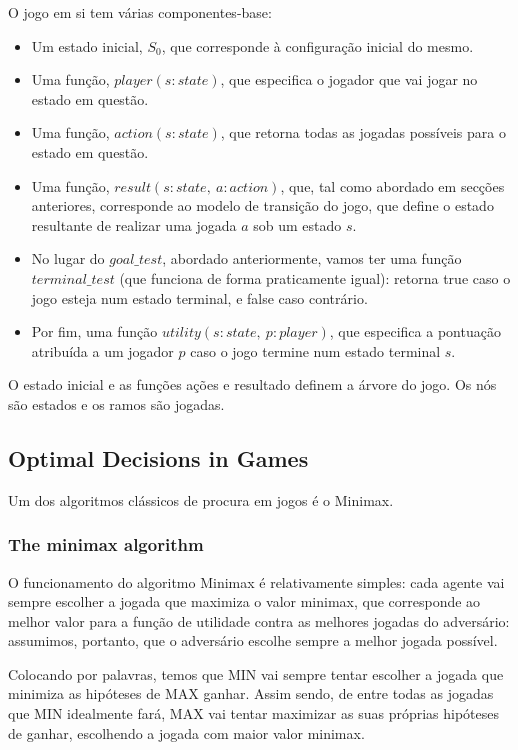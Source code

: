 \documentclass[11pt]{article}
\begin{document}
O jogo em si tem várias componentes-base:
\begin{itemize}[topsep=4pt, itemsep=0pt]
    \item Um estado inicial, $S_0$, que corresponde à configuração inicial do mesmo.
    \item Uma função, $player(s:state)$, que especifica o jogador que vai jogar no estado em questão.
    \item Uma função, $action(s:state)$, que retorna todas as jogadas possíveis para o estado em questão.
    \item Uma função, $result(s:state,\ a:action)$, que, tal como abordado em secções anteriores, corresponde ao modelo de transição do jogo, que define o estado resultante de realizar uma jogada $a$ sob um estado $s$.
    \item No lugar do $goal\_test$, abordado anteriormente, vamos ter uma função $terminal\_test$ (que funciona de forma praticamente igual): retorna true caso o jogo esteja num estado terminal, e false caso contrário.
    \item Por fim, uma função $utility(s:state,\ p:player)$, que especifica a pontuação atribuída a um jogador $p$ caso o jogo termine num estado terminal $s$.
\end{itemize}

O estado inicial e as funções ações e resultado definem a árvore do jogo. Os nós são estados e os ramos são jogadas.

\subsection{Optimal Decisions in Games}

Um dos algoritmos clássicos de procura em jogos é o Minimax.\vspace{4pt}

\subsubsection{The minimax algorithm}

O funcionamento do algoritmo Minimax é relativamente simples: cada agente vai sempre escolher a jogada que maximiza o valor minimax, que corresponde ao melhor valor para a função de utilidade contra as melhores jogadas do adversário: assumimos, portanto, que o adversário escolhe sempre a melhor jogada possível. \vspace{4pt}

Colocando por palavras, temos que MIN vai sempre tentar escolher a jogada que minimiza as hipóteses de MAX ganhar. Assim sendo, de entre todas as jogadas que MIN idealmente fará, MAX vai tentar maximizar as suas próprias hipóteses de ganhar, escolhendo a jogada com maior valor minimax.
\end{document}
